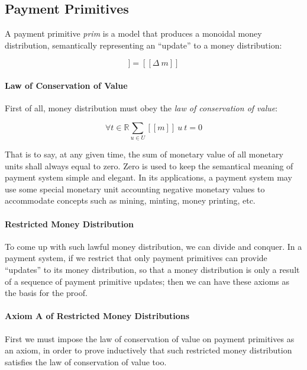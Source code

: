 \subsection{Payment Primitives}

A payment primitive \textit{prim} is a model that produces a monoidal money distribution,
semantically representing an ``update'' to a money distribution:

\begin{equation}
    [\![prim]\!] = [\![\Delta\ m]\!]
\end{equation}

\paragraph{Law of Conservation of Value}

First of all, money distribution must obey the \textit{law of conservation of value}:

\begin{equation}
    \forall t \in \mathbb{R} {\displaystyle \sum_{u \in U} [\![m]\!]\ u\ t = 0}
\end{equation}

That is to say, at any given time, the sum of monetary value of all monetary units shall always
equal to zero. Zero is used to keep the semantical meaning of payment system simple and elegant. In
its applications, a payment system may use some special monetary unit accounting negative monetary
values to accommodate concepts such as mining, minting, money printing, etc.

\paragraph{Restricted Money Distribution}

To come up with such lawful money distribution, we can divide and conquer. In a payment system, if
we restrict that only payment primitives can provide ``updates'' to its money distribution, so that
a money distribution is only a result of a sequence of payment primitive updates; then we can have
these axioms as the basis for the proof.

\paragraph{Axiom A of Restricted Money Distributions}

First we must impose the law of conservation of value on payment primitives as an axiom, in order to
prove inductively that such restricted money distribution satisfies the law of conservation of value
too.

